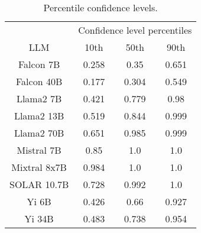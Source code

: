\begin{table*}
\centering
\begin{tabular}{c|c|c|c}
& \multicolumn{3}{c}{Confidence level percentiles} \\ 
LLM & 10th & 50th & 90th\\ \hline
Falcon 7B & 0.258 & 0.35 & 0.651\\
Falcon 40B & 0.177 & 0.304 & 0.549\\
Llama2 7B & 0.421 & 0.779 & 0.98\\
Llama2 13B & 0.519 & 0.844 & 0.999\\
Llama2 70B & 0.651 & 0.985 & 0.999\\
Mistral 7B & 0.85 & 1.0 & 1.0\\
Mixtral 8x7B & 0.984 & 1.0 & 1.0\\
SOLAR 10.7B & 0.728 & 0.992 & 1.0\\
Yi 6B & 0.426 & 0.66 & 0.927\\
Yi 34B & 0.483 & 0.738 & 0.954\\
\hline
\end{tabular}
\caption{Percentile confidence levels.}
\label{tab:percentile_conf}
\end{table*}
